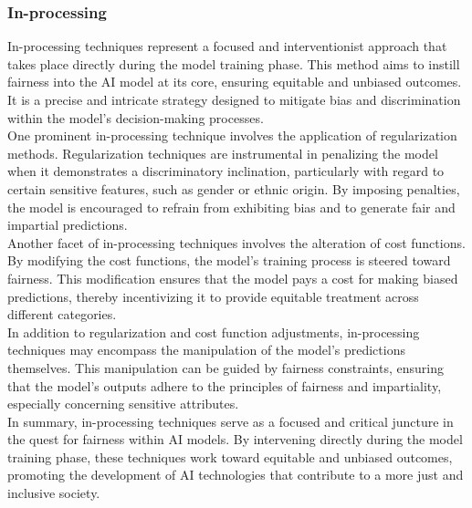 \documentclass[12pt,a4paper,openright,twoside]{book}
\begin{document}
\subsubsection{In-processing}
In-processing techniques represent a focused and interventionist approach that takes place directly during the model training phase. This method aims to instill fairness into the AI model at its core, ensuring equitable and unbiased outcomes. It is a precise and intricate strategy designed to mitigate bias and discrimination within the model's decision-making processes. \\
One prominent in-processing technique involves the application of regularization methods. Regularization techniques are instrumental in penalizing the model when it demonstrates a discriminatory inclination, particularly with regard to certain sensitive features, such as gender or ethnic origin. By imposing penalties, the model is encouraged to refrain from exhibiting bias and to generate fair and impartial predictions. \\
Another facet of in-processing techniques involves the alteration of cost functions. By modifying the cost functions, the model's training process is steered toward fairness. This modification ensures that the model pays a cost for making biased predictions, thereby incentivizing it to provide equitable treatment across different categories. \\
In addition to regularization and cost function adjustments, in-processing techniques may encompass the manipulation of the model's predictions themselves. This manipulation can be guided by fairness constraints, ensuring that the model's outputs adhere to the principles of fairness and impartiality, especially concerning sensitive attributes. \\
In summary, in-processing techniques serve as a focused and critical juncture in the quest for fairness within AI models. By intervening directly during the model training phase, these techniques work toward equitable and unbiased outcomes, promoting the development of AI technologies that contribute to a more just and inclusive society.
\end{document}
